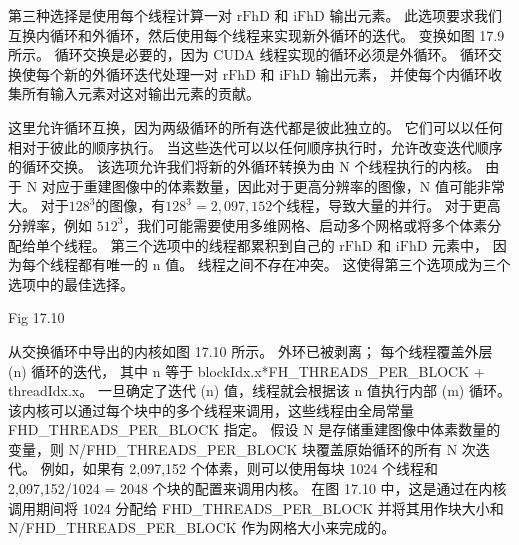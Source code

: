 第三种选择是使用每个线程计算一对 $\mathrm{rFhD}$ 和 $\mathrm{iFhD}$ 输出元素。 
此选项要求我们互换内循环和外循环，然后使用每个线程来实现新外循环的迭代。 
变换如图 17.9 所示。 循环交换是必要的，因为 CUDA 线程实现的循环必须是外循环。 
循环交换使每个新的外循环迭代处理一对 $\mathrm{rFhD}$ 和 $\mathrm{iFhD}$ 输出元素，
并使每个内循环收集所有输入元素对这对输出元素的贡献。

这里允许循环互换，因为两级循环的所有迭代都是彼此独立的。 它们可以以任何相对于彼此的顺序执行。 
当这些迭代可以以任何顺序执行时，允许改变迭代顺序的循环交换。 该选项允许我们将新的外循环转换为由 N 个线程执行的内核。 
由于 N 对应于重建图像中的体素数量，因此对于更高分辨率的图像，$\mathrm{N}$ 值可能非常大。 
对于$128^{3}$的图像，有$128^{3}=$$2,097,152$个线程，导致大量的并行。 
对于更高分辨率，例如 $512^{3}$，我们可能需要使用多维网格、启动多个网格或将多个体素分配给单个线程。 
第三个选项中的线程都累积到自己的 $\mathrm{rFhD}$ 和 $\mathrm{iFhD}$ 元素中，
因为每个线程都有唯一的 $\mathrm{n}$ 值。 线程之间不存在冲突。 这使得第三个选项成为三个选项中的最佳选择。

{\color{red} Fig 17.10}

从交换循环中导出的内核如图 17.10 所示。 
外环已被剥离； 每个线程覆盖外层 (n) 循环的迭代，
其中 $\mathrm{n}$ 等于 blockIdx.x*FH\_THREADS\_PER\_BLOCK + threadIdx.x。 
一旦确定了迭代 (n) 值，线程就会根据该 $\mathrm{n}$ 值执行内部 (m) 循环。 
该内核可以通过每个块中的多个线程来调用，这些线程由全局常量 FHD\_THREADS\_PER\_BLOCK 指定。 
假设 $\mathrm{N}$ 是存储重建图像中体素数量的变量，则 N/FHD\_THREADS\_PER\_BLOCK 块覆盖原始循环的所有 N 次迭代。 
例如，如果有 2,097,152 个体素，则可以使用每块 1024 个线程和 2,097,152/1024 = 2048 个块的配置来调用内核。 
在图 17.10 中，这是通过在内核调用期间将 1024 分配给 FHD\_THREADS\_PER\_BLOCK 
并将其用作块大小和 N/FHD\_THREADS\_PER\_BLOCK 作为网格大小来完成的。

